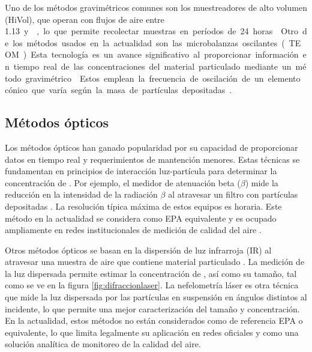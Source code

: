 Uno de los métodos gravimétricos comunes son los muestreadores de alto volumen (HiVol), que operan con flujos de aire entre \SI{1,13} y , lo que permite recolectar muestras  en períodos de 24 horas \citep{QueenslandGov2024b}.

Otro de los métodos usados en la actualidad son las microbalanzas oscilantes (TEOM). Esta tecnología es un avance significativo al proporcionar información en tiempo real de las concentraciones del material particulado mediante un método gravimétrico \citep{QueenslandGov2024}. Estos emplean la frecuencia de oscilación de un elemento cónico que varía según la masa de partículas depositadas \citep{Green2009}.


\subsection{Métodos ópticos}

Los métodos ópticos han ganado popularidad por su capacidad de proporcionar datos en tiempo real y requerimientos de mantención menores. Estas técnicas se fundamentan en principios de interacción luz-partícula para determinar la concentración de \MPF. Por ejemplo, el medidor de atenuación beta ($\beta $) mide la reducción en la intensidad de la radiación $\beta $ al atravesar un filtro con partículas depositadas \cite{MetOne2020}. La resolución típica máxima de estos equipos es horaria. Este método en la actualidad se considera como EPA equivalente y es ocupado ampliamente en redes institucionales de medición de calidad del aire \cite{Torres2021}.

Otros métodos ópticos se basan en la dispersión de luz infrarroja (IR) al atravesar una muestra de aire que contiene material particulado \citep{Skoog2018}. La medición de la luz dispersada permite estimar la concentración de \MPF, así como su tamaño, tal como se ve en la figura \ref{fig:difraccionlaser}. La nefelometría láser es otra técnica que mide la luz dispersada por las partículas en suspensión en ángulos distintos al incidente, lo que permite una mejor caracterización del tamaño y concentración. En la actualidad, estos métodos no están considerados como de referencia EPA o equivalente, lo que limita legalmente su aplicación en redes oficiales y como una solución analítica de monitoreo de la calidad del aire.

